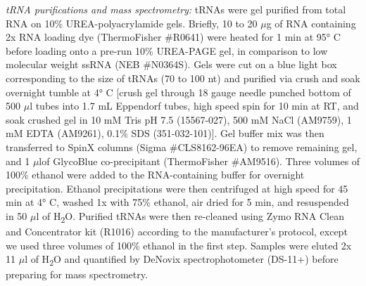 \documentclass[times, twoside]{zHenriquesLab-StyleBioRxiv}
\begin{document}
\textit{tRNA purifications and mass spectrometry: } 
\newline
tRNAs were gel purified from total RNA on 10\% UREA-polyacrylamide gels. Briefly, 10 to 20 \(\mu\)g of RNA containing 2x RNA loading dye (ThermoFisher \#R0641) were heated for 1 min at 95° C before loading onto a pre-run 10\% UREA-PAGE gel, in comparison to low molecular weight ssRNA (NEB \#N0364S). Gels were cut on a blue light box corresponding to the size of tRNAs (70 to 100 nt) and purified via crush and soak overnight tumble at 4° C [crush gel through 18 gauge needle punched bottom of 500 \(\mu\)l tubes into 1.7 mL Eppendorf tubes, high speed spin for 10 min at RT, and soak crushed gel in 10 mM Tris pH 7.5 (15567-027), 500 mM NaCl (AM9759), 1 mM EDTA (AM9261), 0.1\% SDS (351-032-101)]. Gel buffer mix was then transferred to SpinX columns (Sigma \#CLS8162-96EA) to remove remaining gel, and 1 \(\mu\)lof GlycoBlue co-precipitant (ThermoFisher \#AM9516). Three volumes of 100\% ethanol were added to the RNA-containing buffer for overnight precipitation. Ethanol precipitations were then centrifuged at high speed for 45 min at 4° C, washed 1x with 75\% ethanol, air dried for 5 min, and resuspended in 50 \(\mu\)l of H\textsubscript{2}O. Purified tRNAs were then re-cleaned using Zymo RNA Clean and Concentrator kit (R1016) according to the manufacturer’s protocol, except we used three volumes of 100\% ethanol in the first step. Samples were eluted 2x 11 \(\mu\)l of H\textsubscript{2}O and quantified by DeNovix spectrophotometer (DS-11+) before preparing for mass spectrometry. 
\newline
\end{document}
